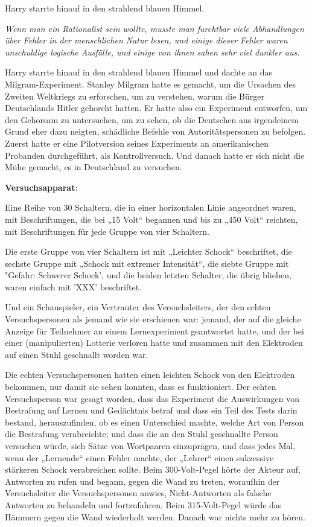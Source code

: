 {Harry starrte hinauf in den strahlend blauen Himmel.

\emph{Wenn man ein Rationalist sein wollte, musste man furchtbar viele Abhandlungen über Fehler in der menschlichen Natur lesen, und einige dieser Fehler waren unschuldige logische Ausfälle, und einige von ihnen sahen sehr viel dunkler aus.}

Harry starrte hinauf in den strahlend blauen Himmel und dachte an das Milgram-Experiment. Stanley Milgram hatte es gemacht, um die Ursachen des Zweiten Weltkriegs zu erforschen, um zu verstehen, warum die Bürger Deutschlands Hitler gehorcht hatten. Er hatte also ein Experiment entworfen, um den Gehorsam zu untersuchen, um zu sehen, ob die Deutschen aus irgendeinem Grund eher dazu neigten, schädliche Befehle von Autoritätspersonen zu befolgen. Zuerst hatte er eine Pilotversion seines Experiments an amerikanischen Probanden durchgeführt, als Kontrollversuch. Und danach hatte er sich nicht die Mühe gemacht, es in Deutschland zu versuchen.

\textbf{Versuchsapparat}:

Eine Reihe von 30 Schaltern, die in einer horizontalen Linie angeordnet waren, mit Beschriftungen, die bei „15 Volt“ begannen und bis zu „450 Volt“ reichten, mit Beschriftungen für jede Gruppe von vier Schaltern.

Die erste Gruppe von vier Schaltern ist mit „Leichter Schock“ beschriftet, die sechste Gruppe mit „Schock mit extremer Intensität“, die siebte Gruppe mit "Gefahr: Schwerer Schock', und die beiden letzten Schalter, die übrig blieben, waren einfach mit 'XXX' beschriftet.

Und ein Schauspieler, ein Vertrauter des Versuchsleiters, der den echten Versuchspersonen als jemand wie sie erschienen war: jemand, der auf die gleiche Anzeige für Teilnehmer an einem Lernexperiment geantwortet hatte, und der bei einer (manipulierten) Lotterie verloren hatte und zusammen mit den Elektroden auf einen Stuhl geschnallt worden war.

Die echten Versuchspersonen hatten einen leichten Schock von den Elektroden bekommen, nur damit sie sehen konnten, dass es funktioniert. Der echten Versuchsperson war gesagt worden, dass das Experiment die Auswirkungen von Bestrafung auf Lernen und Gedächtnis betraf und dass ein Teil des Tests darin bestand, herauszufinden, ob es einen Unterschied machte, welche Art von Person die Bestrafung verabreichte; und dass die an den Stuhl geschnallte Person versuchen würde, sich Sätze von Wortpaaren einzuprägen, und dass jedes Mal, wenn der „Lernende“ einen Fehler machte, der „Lehrer“ einen sukzessive stärkeren Schock verabreichen sollte. Beim 300-Volt-Pegel hörte der Akteur auf, Antworten zu rufen und begann, gegen die Wand zu treten, woraufhin der Versuchsleiter die Versuchspersonen anwies, Nicht-Antworten als falsche Antworten zu behandeln und fortzufahren. Beim 315-Volt-Pegel würde das Hämmern gegen die Wand wiederholt werden. Danach war nichts mehr zu hören.

}
